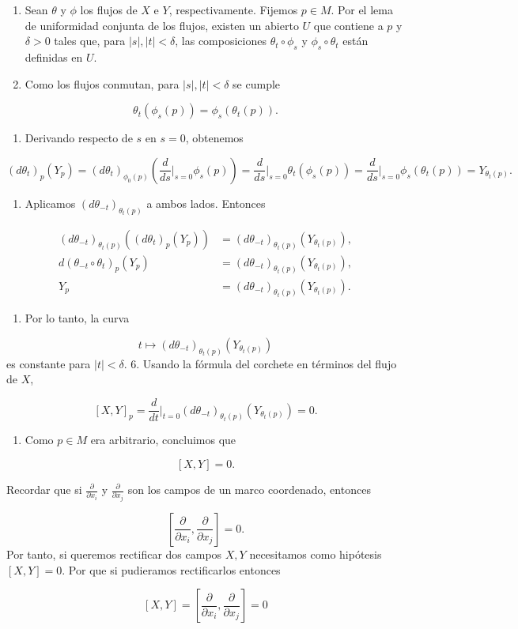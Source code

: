 \begin{bookproof}{}
\begin{enumerate}
\item Sean $\theta$ y $\phi$ los flujos de $X$ e $Y$, respectivamente. Fijemos $p\in M$. Por el lema de uniformidad conjunta de los flujos, existen un abierto $U$ que contiene a $p$ y $\delta>0$ tales que, para $|s|,|t|<\delta$, las composiciones $\theta_t\circ\phi_s$ y $\phi_s\circ\theta_t$ están definidas en $U$.
\item Como los flujos conmutan, para $|s|,|t|<\delta$ se cumple
\end{enumerate}
\[
\theta_t(\phi_s(p))=\phi_s(\theta_t(p)).
\]
\begin{enumerate}[start=3]
\item Derivando respecto de $s$ en $s=0$, obtenemos
\end{enumerate}
\[
(d\theta_t)_p(Y_p)=(d\theta_t)_{\phi_0(p)}\left(\frac{d}{ds}\bigg|_{s=0}\phi_s(p)\right)=\frac{d}{ds}\bigg|_{s=0}\theta_t(\phi_s(p))=\frac{d}{ds}\bigg|_{s=0}\phi_s(\theta_t(p))=Y_{\theta_t(p)}.
\]
\begin{enumerate}[start=4]
\item Aplicamos $(d\theta_{-t})_{\theta_t(p)}$ a ambos lados. Entonces
\end{enumerate}
\[
\begin{aligned}(d\theta_{-t})_{\theta_t(p)}\left((d\theta_t)_p(Y_p)\right)&=(d\theta_{-t})_{\theta_t(p)}\left(Y_{\theta_t(p)}\right),\\d(\theta_{-t}\circ\theta_t)_p(Y_p)&=(d\theta_{-t})_{\theta_t(p)}\left(Y_{\theta_t(p)}\right),\\Y_p&=(d\theta_{-t})_{\theta_t(p)}\left(Y_{\theta_t(p)}\right).\end{aligned}
\]
\begin{enumerate}[start=5]
\item Por lo tanto, la curva
\end{enumerate}
\[
t\mapsto(d\theta_{-t})_{\theta_t(p)}\left(Y_{\theta_t(p)}\right)
\]
es constante para $|t|<\delta$. 6. Usando la fórmula del corchete en términos del flujo de $X$,

\[
[X,Y]_p=\frac{d}{dt}\bigg|_{t=0}(d\theta_{-t})_{\theta_t(p)}\left(Y_{\theta_t(p)}\right)=0.
\]
\begin{enumerate}[start=7]
\item Como $p\in M$ era arbitrario, concluimos que
\end{enumerate}
\[
[X,Y]=0.
\]
\bookqed
\end{bookproof}
\begin{bookremark}{}
Recordar que si $\frac{\partial}{\partial x_i}$ y $\frac{\partial}{\partial x_j}$ son los campos de un marco coordenado, entonces

\[
\left[\frac{\partial}{\partial x_i},\frac{\partial}{\partial x_j}\right]=0.
\]
Por tanto, si queremos rectificar dos campos $X,Y$ necesitamos como hipótesis $[X,Y]=0$. Por que si pudieramos rectificarlos entonces

\[
[X,Y]=\left[\frac{\partial}{\partial x_i},\frac{\partial}{\partial x_j}\right]=0
\]
\end{bookremark}
